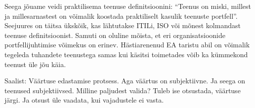 Seega jõuame veidi praktilisema teenuse definitsioonini: \enquote{Teenus on miski, millest ja millesarnastest on võimalik koostada praktiliselt kasulik teenuste portfell}. Seejuures on täitsa ükskõik, kas lähtutakse ITILi, ISO või mõnest kolmandast teenuse definitsioonist. Samuti on oluline mõista, et eri organisatsioonide portfellijuhtimise võimekus on erinev. Hästiarenenud EA taristu abil on võimalik tegeleda tuhandete teenustega samas kui käsitsi toimetades võib ka kümmekond teenust üle jõu käia.

\TODO Saalist: Väärtuse edastamise protsess. Aga väärtus on subjektiivne. Ja seega on teenused subjektiivsed. Milline paljudest valida? Tuleb ise otsustada, väärtuse järgi. Ja otsust üle vaadata, kui vajadustele ei vasta.
